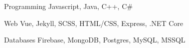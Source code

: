 

\begin{cvskills}

  \cvskill
    {Programming} %
    {Javascript, Java, C++, C\#} %

  \cvskill
    {Web} %
    {Vue, Jekyll, SCSS, HTML/CSS, Express, .NET Core} %

  \cvskill
    {Databases} %
    {Firebase, MongoDB, Postgres, MySQL, MSSQL} %

\end{cvskills}
